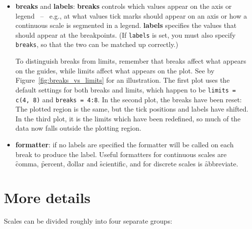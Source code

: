\begin{itemize}
  \item {\bf breaks} and {\bf labels}: {\bf breaks} controls which values appear on the axis or legend ~--~ e.g., at what values tick marks should appear on an axis or how a continuous scale is segmented in a legend.  {\bf labels} specifies the values that should appear at the breakpoints. (If {\tt labels} is set, you must also specify {\tt breaks}, so that the two can be matched up correctly.)  

  To distinguish breaks from limits, remember that breaks affect what appears on the guides, while limits affect what appears on the plot.  See by Figure~\ref{fig:breaks_vs_limits} for an illustration.  The first plot uses the default settings for both breaks and limits, which happen to be {\tt limits = c(4, 8)} and {\tt breaks = 4:8}.  In the second plot, the breaks have been reset: The plotted region is the same, but the tick positions and labels have shifted.  In the third plot, it is the limits which have been redefined, so much of the data now falls outside the plotting region. 
  
    

  \item {\bf formatter}: if no labels are specified the formatter will be called on each break to produce the label.  Useful formatters for continuous scales are \f{comma}, \f{percent}, \f{dollar} and \f{scientific}, and for discrete scales is \f{abbreviate}.
\end{itemize}

\section{More details}
\label{sec:more-details}

Scales can be divided roughly into four separate groups:

